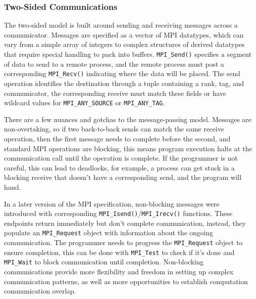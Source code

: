 \subsubsection{Two-Sided Communications}
The two-sided model is built around sending and receiving messages across a communicator.
Messages are specified as a vector of MPI datatypes, which can vary from a simple array of integers to complex structures of derived datatypes that require special handling to pack into buffers. 
\texttt{MPI\_Send()} specifies a segment of data to send to a remote process, and the remote process must post a corresponding \texttt{MPI\_Recv()} indicating where the data will be placed. 
The send operation identifies the destination through a tuple containing a rank, tag, and communicator, the corresponding receive must match these fields or have wildcard values for \texttt{MPI\_ANY\_SOURCE} or \texttt{MPI\_ANY\_TAG}.

There are a few nuances and gotchas to the message-passing model.
Messages are non-overtaking, so if two back-to-back sends can match the same receive operation, then the first message needs to complete before the second, and standard MPI operations are blocking, this means program execution halts at the communication call until the operation is complete.
If the programmer is not careful, this can lead to deadlocks, for example, a process can get stuck in a blocking receive that doesn't have a corresponding send, and the program will hand.

In a later version of the MPI specification, non-blocking messages were introduced with corresponding \texttt{MPI\_Isend()}/\texttt{MPI\_Irecv()} functions.
These endpoints return immediately but don't complete communication, instead, they populate an \texttt{MPI\_Request} object with information about the ongoing communication.
The programmer needs to progress the \texttt{MPI\_Request} object to ensure completion, this can be done with \texttt{MPI\_Test} to check if it's done and \texttt{MPI\_Wait} to block communication until completion.
Non-blocking communications provide more flexibility and freedom in setting up complex communication patterns, as well as more opportunities to establish computation communication overlap.


